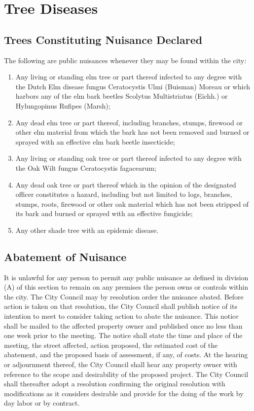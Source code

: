\section{Tree Diseases}
\subsection{Trees Constituting Nuisance Declared}
The following are public nuisances whenever they may be found within the city:
\begin{enumerate}[{\indent}1)]
    \item Any living or standing elm tree or part thereof infected to any degree with the Dutch Elm disease fungus Ceratocystis Ulmi (Buisman) Moreau or which harbors any of the elm bark beetles Scolytus Multistriatus (Eichh.) or Hylungopinus Rufipes (Marsh);
    \item Any dead elm tree or part thereof, including branches, stumps, firewood or other elm material from which the bark has not been removed and burned or sprayed with an effective elm bark beetle insecticide;
    \item Any living or standing oak tree or part thereof infected to any degree with the Oak Wilt fungus Ceratocystis fagacearum;
    \item Any dead oak tree or part thereof which in the opinion of the designated officer constitutes a hazard, including but not limited to logs, branches, stumps, roots, firewood or other oak material which has not been stripped of its bark and burned or sprayed with an effective fungicide;
    \item Any other shade tree with an epidemic disease.
\end{enumerate}
\subsection{Abatement of Nuisance}
It is unlawful for any person to permit any public nuisance as defined in division (A) of this section to remain on any premises the person owns or controls within the city. The City Council may by resolution order the nuisance abated. Before action is taken on that resolution, the City Council shall publish notice of its intention to meet to consider taking action to abate the nuisance. This notice shall be mailed to the affected property owner and published once no less than one week prior to the meeting. The notice shall state the time and place of the meeting, the street affected, action proposed, the estimated cost of the abatement, and the proposed basis of assessment, if any, of costs. At the hearing or adjournment thereof, the City Council shall hear any property owner with reference to the scope and desirability of the proposed project. The City Council shall thereafter adopt a resolution confirming the original resolution with modifications as it considers desirable and provide for the doing of the work by day labor or by contract.
